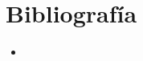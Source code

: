 \documentclass[11pt, a4paper,spanish]{article}
\begin{document}
				\paragraph{}

	
	\newpage

		\section{Bibliografía}

			\begin{itemize}
			
				\item 		
			\end{itemize}
\end{document}
